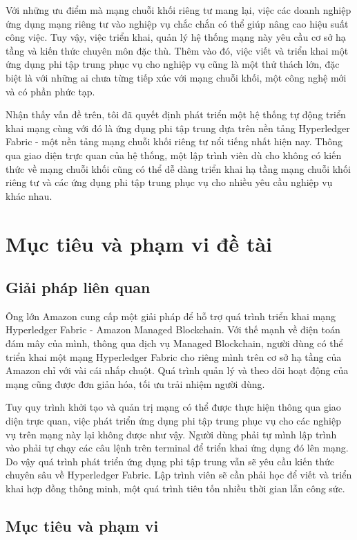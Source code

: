 \documentclass[../DoAn.tex]{subfiles}
\begin{document}
Với những ưu điểm mà mạng chuỗi khối riêng tư mang lại, việc các doanh nghiệp ứng dụng mạng riêng tư vào nghiệp vụ chắc chắn có thể giúp nâng cao hiệu suất công việc. Tuy vậy, việc triển khai, quản lý hệ thống mạng này yêu cầu cơ sở hạ tầng và kiến thức chuyên môn đặc thù. Thêm vào đó, việc viết và triển khai một ứng dụng phi tập trung phục vụ cho nghiệp vụ cũng là một thử thách lớn, đặc biệt là với những ai chưa từng tiếp xúc với mạng chuỗi khối, một công nghệ mới và có phần phức tạp. 

Nhận thấy vấn đề trên, tôi đã quyết định phát triển một hệ thống tự động triển khai mạng cùng với đó là ứng dụng phi tập trung dựa trên nền tảng Hyperledger Fabric - một nền tảng mạng chuỗi khối riêng tư nổi tiếng nhất hiện nay. Thông qua giao diện trực quan của hệ thống, một lập trình viên dù cho không có kiến thức về mạng chuỗi khối cũng có thể dễ dàng triển khai hạ tầng mạng chuỗi khối riêng tư và các ứng dụng phi tập trung phục vụ cho nhiều yêu cầu nghiệp vụ khác nhau.

\section{Mục tiêu và phạm vi đề tài}
\label{section:1.2}

\subsection{Giải pháp liên quan}
Ông lớn Amazon cung cấp một giải pháp để hỗ trợ quá trình triển khai mạng Hyperledger Fabric - Amazon Managed Blockchain. Với thế mạnh về điện toán đám mây của mình, thông qua dịch vụ Managed Blockchain, người dùng có thể triển khai một mạng Hyperledger Fabric cho riêng mình trên cơ sở hạ tầng của Amazon chỉ với vài cái nhấp chuột. Quá trình quản lý và theo dõi hoạt động của mạng cũng được đơn giản hóa, tối ưu trải nhiệm người dùng. 

Tuy quy trình khởi tạo và quản trị mạng có thể được thực hiện thông qua giao diện trực quan, việc phát triển ứng dụng phi tập trung phục vụ cho các nghiệp vụ trên mạng này lại không được như vậy. Người dùng phải tự mình lập trình vào phải tự chạy các câu lệnh trên terminal để triển khai ứng dụng đó lên mạng. Do vậy quá trình phát triển ứng dụng phi tập trung vẫn sẽ yêu cầu kiến thức chuyên sâu về Hyperledger Fabric. Lập trình viên sẽ cần phải học để viết và triển khai hợp đồng thông minh, một quá trình tiêu tốn nhiều thời gian lẫn công sức.

\subsection{Mục tiêu và phạm vi}
\end{document}
